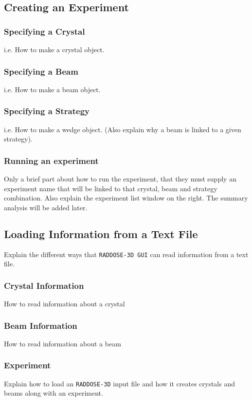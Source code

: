 \documentclass[a4paper]{article}
\newcommand{\RDG}{\texttt{RADDOSE-3D GUI}\xspace}
\newcommand{\RD}{\texttt{RADDOSE-3D}\xspace}
\begin{document}
\subsection{Creating an Experiment}

\subsubsection{Specifying a Crystal}
i.e. How to make a crystal object.

\subsubsection{Specifying a Beam}
i.e. How to make a beam object.

\subsubsection{Specifying a Strategy}
i.e. How to make a wedge object. (Also explain why a beam is linked to a given strategy).

\subsubsection{Running an experiment}
Only a brief part about how to run the experiment, that they must supply an experiment name that will be linked to that crystal, beam and strategy combination. Also explain the experiment list window on the right. The summary analysis will be added later.

\subsection{Loading Information from a Text File}
Explain the different ways that \RDG can read information from a text file.

\subsubsection{Crystal Information}
How to read information about a crystal

\subsubsection{Beam Information}
How to read information about a beam

\subsubsection{Experiment}
Explain how to load an \RD input file and how it creates crystals and beams along with an experiment.
\end{document}
